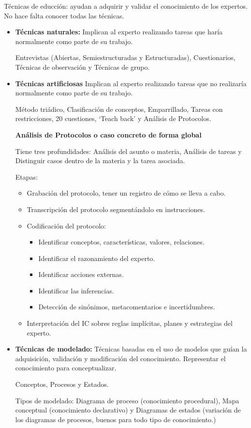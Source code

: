 \documentclass[12pt, twoside, openright]{report} %
\begin{document}
Técnicas de educción: ayudan a adquirir y validar el conocimiento de los expertos. No hace falta conocer todas las técnicas.
\begin{itemize}
	\item \textbf{Técnicas naturales:} Implican al experto realizando tareas que haría normalmente como parte de su trabajo.

	      Entrevistas (Abiertas, Semiestructuradas y Estructuradas), Cuestionarios, Técnicas de observación y Técnicas de grupo.
	\item \textbf{Técnicas artificiosas} Implican al experto realizando tareas que no realizaría normalmente como parte de su trabajo.

	      Método triádico, Clasificación de conceptos, Emparrillado, Tareas con restricciones, 20 cuestiones, ‘Teach back’ y Análisis de Protocolos.

	      \textbf{Análisis de Protocolos o caso concreto de forma global}

	      Tiene tres profundidades: Análisis del asunto o materia, Análisis de tareas y Distinguir casos dentro de la materia y la tarea asociada.

	      Etapas:
	      \begin{itemize}
		      \item Grabación del protocolo, tener un registro de cómo se lleva a cabo.
		      \item Transcripción del protocolo segmentándolo en instrucciones.
		      \item Codificación del protocolo:
		            \begin{itemize}
			            \item Identificar conceptos, características, valores, relaciones.
			            \item Identificar el razonamiento del experto.
			            \item Identificar acciones externas.
			            \item Identificar las inferencias.
			            \item Detección de sinónimos, metacomentarios e incertidumbres.
		            \end{itemize}
		      \item Interpretación del IC sobres reglas implícitas, planes y estrategias del experto.
	      \end{itemize}

	\item \textbf{Técnicas de modelado:} Técnicas basadas en el uso de modelos que guían la adquisición, validación y modificación del conocimiento. Representar el conocimiento para conceptualizar.

	      Conceptos, Procesos y Estados.

	      Tipos de modelado: Diagrama de proceso (conocimiento procedural), Mapa conceptual (conocimiento declarativo) y Diagramas de estados (variación de los diagramas de procesos, buenos para todo tipo de conocimiento.)
\end{itemize}
\end{document}
